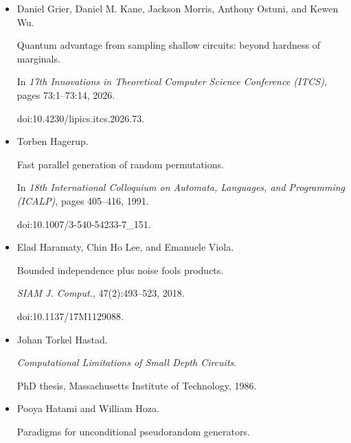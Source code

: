\documentclass[10pt,a4paper]{article}
\begin{document}
\begin{itemize}
\emph{ACM Trans. Comput. Theory}, 12(3):20:1–20:13, 2020.


doi:10.1145/3404858.





\item[] 
[21]

Daniel Grier, Daniel M. Kane, Jackson Morris, Anthony Ostuni, and Kewen Wu.


Quantum advantage from sampling shallow circuits: beyond hardness of
marginals.


In \emph{17th Innovations in Theoretical Computer Science Conference
(ITCS)}, pages 73:1–73:14, 2026.


doi:10.4230/lipics.itcs.2026.73.





\item[] 
[22]

Torben Hagerup.


Fast parallel generation of random permutations.


In \emph{18th International Colloquium on Automata, Languages, and
Programming (ICALP)}, pages 405–416, 1991.


doi:10.1007/3-540-54233-7\_151.





\item[] 
[23]

Elad Haramaty, Chin Ho Lee, and Emanuele Viola.


Bounded independence plus noise fools products.


\emph{SIAM J. Comput.}, 47(2):493–523, 2018.


doi:10.1137/17M1129088.





\item[] 
[24]

Johan Torkel Hastad.


\emph{Computational Limitations of Small Depth Circuits}.


PhD thesis, Massachusetts Institute of Technology, 1986.





\item[] 
[25]

Pooya Hatami and William Hoza.


Paradigms for unconditional pseudorandom generators.



\end{itemize}
\end{document}
